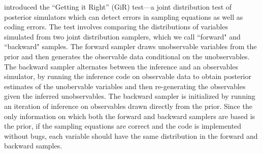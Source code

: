    \cite{geweke2004getting} introduced the ``Getting it Right'' (GiR) test---a joint distribution test of posterior simulators which can detect errors in sampling equations as well as coding errors.  The test involves comparing the distributions of variables simulated from two joint distribution samplers, which we call ``forward" and ``backward" samples. The forward sampler draws unobservable variables from the prior and then generates the observable data conditional on the unobservables. The backward sampler alternates between the inference and an observables simulator, by running the inference code on observable data to obtain posterior estimates of the unobervable variables and then re-generating the observables given the inferred unobservables. The backward sampler is initialized by running an iteration of inference on observables drawn directly from the prior. Since the only information on which both the forward and backward samplers are based is the prior, if the sampling equations are correct and the code is implemented without bugs, each variable should have the same distribution in the forward and backward samples.
   
